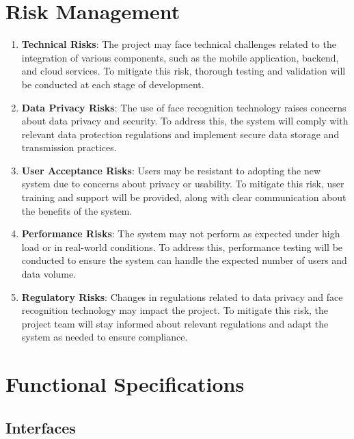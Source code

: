 \documentclass[openany]{report}
\begin{document}
\section{Risk Management}
\begin{enumerate}
    \item \textbf{Technical Risks}: The project may face technical challenges related to the integration of various components, such as the mobile application, backend, and cloud services. To mitigate this risk, thorough testing and validation will be conducted at each stage of development.
    \item \textbf{Data Privacy Risks}: The use of face recognition technology raises concerns about data privacy and security. To address this, the system will comply with relevant data protection regulations and implement secure data storage and transmission practices.
    \item \textbf{User Acceptance Risks}: Users may be resistant to adopting the new system due to concerns about privacy or usability. To mitigate this risk, user training and support will be provided, along with clear communication about the benefits of the system.
    \item \textbf{Performance Risks}: The system may not perform as expected under high load or in real-world conditions. To address this, performance testing will be conducted to ensure the system can handle the expected number of users and data volume.
    \item \textbf{Regulatory Risks}: Changes in regulations related to data privacy and face recognition technology may impact the project. To mitigate this risk, the project team will stay informed about relevant regulations and adapt the system as needed to ensure compliance.
\end{enumerate}
\section{Functional Specifications}
\subsection{Interfaces}
\end{document}
